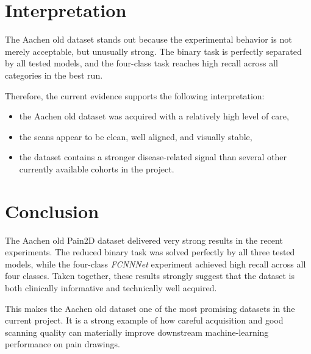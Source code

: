 \documentclass[11pt,a4paper]{article}
\begin{document}
\section{Interpretation}

The Aachen old dataset stands out because the experimental behavior is not merely acceptable, but unusually strong. The binary task is perfectly separated by all tested models, and the four-class task reaches high recall across all categories in the best run.

Therefore, the current evidence supports the following interpretation:

\begin{itemize}
    \item the Aachen old dataset was acquired with a relatively high level of care,
    \item the scans appear to be clean, well aligned, and visually stable,
    \item the dataset contains a stronger disease-related signal than several other currently available cohorts in the project.
\end{itemize}

\section{Conclusion}

The Aachen old Pain2D dataset delivered very strong results in the recent experiments. The reduced binary task was solved perfectly by all three tested models, while the four-class \textit{FCNNNet} experiment achieved high recall across all four classes. Taken together, these results strongly suggest that the dataset is both clinically informative and technically well acquired.

This makes the Aachen old dataset one of the most promising datasets in the current project. It is a strong example of how careful acquisition and good scanning quality can materially improve downstream machine-learning performance on pain drawings.
\end{document}
